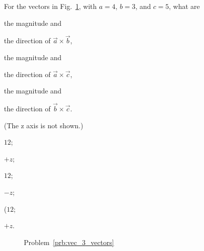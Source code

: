\begin{problem}\label{prb:vec_3_vectors}
	For the vectors in Fig.~\ref{vec_3_vectors}, with $a = 4$, $b = 3$, and $c = 5$, what are 
	\begin{enumerate*}[label=(\alph*)]
		\item the magnitude and
		\item the direction of $\vec a \times \vec b$,
		\item the magnitude and
		\item the direction of $\vec a \times \vec c$,
		\item the magnitude and
		\item the direction of $\vec b \times \vec c$.
	\end{enumerate*}
(The z axis is not shown.)
	\begin{solution}
		\begin{enumerate*}[label=(\alph*)]
			\item $12$;
			\item  $+z$;
			\item  $12$;
			\item  $-z$;
			\item  ($12$;
			\item  $+z$.
		\end{enumerate*}
	\end{solution}
\end{problem}

\begin{figure}[h!]\centering
	\caption{Problem~\ref{prb:vec_3_vectors}}
	\label{vec_3_vectors}
\end{figure}




